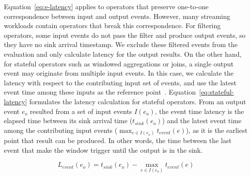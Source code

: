 \documentclass[runningheads]{llncs}
\begin{document}
Equation~\ref{eq:e-latency} applies to operators that preserve one-to-one correspondence between input and output events.
However, many streaming workloads contain operators that break this correspondence.
For filtering operators, some input events do not pass the filter and produce output events, so they have no sink arrival timestamp.
We exclude these filtered events from the evaluation and only calculate latency for the output results.
On the other hand, for stateful operators such as windowed aggregations or joins, a single output event may originate from multiple input events.
In this case, we calculate the latency with respect to the contributing input set of events, and use the latest event time among these inputs as the reference point~\cite{karimov2018}.
Equation~\ref{eq:stateful-latency} formulates the latency calculation for stateful operators.
From an output event $e_o$ resulted from a set of input events $I(e_o)$, the event time latency is the elapsed time between its sink arrival time ($t_{\mathit{sink}}(e_o)$) and the latest event time among the contributing input events ($\max_{e \in I(e_o)} t_{\mathit{event}}(e)$), as it is the earliest point that result can be produced.
In other words, the time between the last event that make the window trigger until the output is in the sink.

\begin{equation}
L_{event}(e_o) = t_{\mathit{sink}}(e_o) - \max_{e \in I(e_o)} t_{\mathit{event}}(e)
\label{eq:stateful-latency}
\end{equation}





\end{document}
